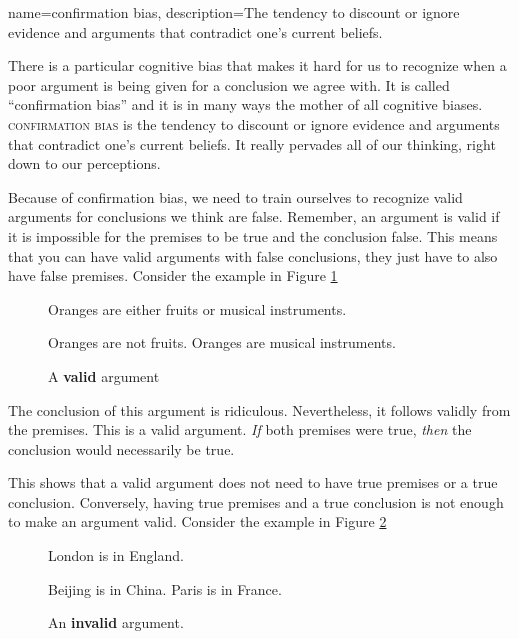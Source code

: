{
name=confirmation bias,
description={The tendency to discount or ignore evidence and arguments that contradict one's current beliefs.}
}

There is a particular cognitive bias that makes it hard for us to recognize when a poor argument is being given for a conclusion we agree with. It is called ``confirmation bias'' and it is in many ways the mother of all cognitive biases.  \textsc{\Gls{confirmation bias}} \label{def:confirmation_bias} is the tendency to discount or ignore evidence and arguments that contradict one's current beliefs. It really pervades all of our thinking, right down to our perceptions. 

Because of confirmation bias, we need to train ourselves to recognize valid arguments for conclusions we think are false. Remember, an argument is valid if it is impossible for the premises to be true and the conclusion false. This means that you can have valid arguments with false conclusions, they just have to also have false premises. Consider the example in Figure \ref{fig:valid_oranges}


\begin{figure}[t]
\begin{mdframed}[style=mytablebox]
\begin{earg*}
\item Oranges are either fruits or musical instruments.
\item Oranges are not fruits.
\itemc Oranges are musical instruments.
\end{earg*}
\end{mdframed}
\caption{A \textbf{valid} argument} \label{fig:valid_oranges}
\end{figure}

\label{valid_arg_false_premises}

The conclusion of this argument is ridiculous. Nevertheless, it follows validly from the premises. This is a valid argument. \emph{If} both premises were true, \emph{then} the conclusion would necessarily be true.

This shows that a valid argument does not need to have true premises or a true conclusion. Conversely, having true premises and a true conclusion is not enough to make an argument valid. Consider the example in Figure \ref{fig:invalid_paris}


\begin{figure}[b]
\begin{mdframed}[style=mytablebox]
\begin{earg*}
\item London is in England.
\item Beijing is in China.
\itemc[.3] Paris is in France.
\end{earg*}
\end{mdframed}
\caption{An \textbf{invalid} argument.} \label{fig:invalid_paris}
\end{figure}
\label{invalid_true_premises_and_conclusion}


